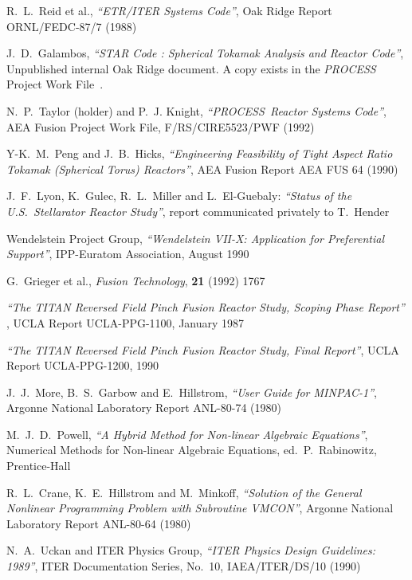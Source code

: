 \documentclass[11pt,a4paper]{report}
\newcommand{\PS}{\mbox{\it PROCESS\/ }}
\begin{document}
\begin{thebibliography}{99}

R.\ L.\ Reid et al.,
{\it ``ETR/ITER Systems Code''},
Oak Ridge Report ORNL/FEDC-87/7
(1988)

J.\ D.\ Galambos,
{\it ``STAR Code : Spherical Tokamak Analysis and Reactor Code''},
Unpublished internal Oak Ridge document. A copy exists in the \PS
Project Work File~\cite{PWF}.

N.\ P.\ Taylor (holder) and P.\ J. Knight,
{\it ``\PS Reactor Systems Code''},
AEA Fusion Project Work File, F/RS/CIRE5523/PWF
(1992)

Y-K.\ M.\ Peng and J.\ B.\ Hicks,
{\it ``Engineering Feasibility of Tight Aspect Ratio Tokamak
(Spherical Torus) Reactors''},
AEA Fusion Report AEA FUS 64
(1990)

J.\ F.\ Lyon, K.\ Gulec, R.\ L.\ Miller and L.\ El-Guebaly:
{\it ``Status of the U.S.\ Stellarator Reactor Study''},
report communicated privately to T.\ Hender

Wendelstein Project Group,
{\it ``Wendelstein VII-X: Application for Preferential Support''},
IPP-Euratom Association, August 1990

G.\ Grieger et al., {\it Fusion Technology}, {\bf 21} (1992) 1767

{\it ``The TITAN Reversed Field Pinch Fusion Reactor Study, Scoping Phase
Report''} ,
UCLA Report UCLA-PPG-1100, January 1987

{\it ``The TITAN Reversed Field Pinch Fusion Reactor Study, Final Report''},
UCLA Report UCLA-PPG-1200, 1990

J.\ J.\ More, B.\ S.\ Garbow and E.\ Hillstrom,
{\it ``User Guide for MINPAC-1''},
Argonne National Laboratory Report ANL-80-74
(1980)

M.\ J.\ D.\ Powell,
{\it ``A Hybrid Method for Non-linear Algebraic Equations''},
Numerical Methods for Non-linear Algebraic Equations, ed.\ P.\ Rabinowitz,
Prentice-Hall

R.\ L.\ Crane, K.\ E.\ Hillstrom and M.\ Minkoff,
{\it ``Solution of the General Nonlinear Programming Problem with
Subroutine VMCON''},
Argonne National Laboratory Report ANL-80-64
(1980)

N.\ A.\ Uckan and ITER Physics Group,
{\it ``ITER Physics Design Guidelines: 1989''},
ITER Documentation Series, No.\ 10, IAEA/ITER/DS/10
(1990)


\end{thebibliography}
\end{document}
